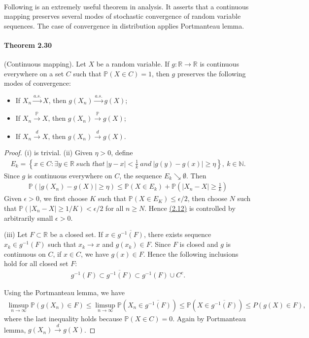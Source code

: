 \documentclass{article}
\numberwithin{equation}{section}
\renewcommand{\P}{\mathbb{P}}
\theoremstyle{plain}
\theoremstyle{definition}
\begin{document}
\paragraph{} Following is an extremely useful theorem in analysis. It asserts that a continuous mapping preserves several modes of stochastic convergence of random variable sequences. The case of convergence in distribution applies Portmanteau lemma. 

\paragraph{Theorem 2.30\label{thm:2.30}} (Continuous mapping). Let $X$ be a random variable. If $g:\mathbb{R}\to\mathbb{R}$ is continuous everywhere on a set $C$ such that $\P(X\in C)=1$, then $g$ preserves the following modes of convergence:
\begin{itemize}
	\item[(i)] If $X_n\overset{a.s.}{\to} X$, then $g(X_n)\overset{a.s.}{\to} g(X)$; 
	\item[(ii)] If $X_n\overset{\P}{\to}X$, then $g(X_n)\overset{\P}{\to}g(X)$; 
	\item[(iii)] If $X_n\overset{d}{\to}X$, then $g(X_n)\overset{d}{\to}g(X)$.
\end{itemize}

\begin{proof}
(i) is trivial. (ii) Given $\eta>0$, define
\begin{align*}
	E_k=\left\{x\in C:\exists y\in\mathbb{R}\ \textit{such that}\ \vert y-x\vert<\frac{1}{k}\ \textit{and}\ \vert g(y)-g(x)\vert\geq\eta\right\},\ k\in\mathbb{N}.
\end{align*}
Since $g$ is continuous everywhere on $C$, the sequence $E_k\searrow\emptyset$. Then
\begin{align*}
	\P\left(\vert g(X_n)-g(X)\vert\geq\eta\right) \leq \P(X\in E_k)+\P\left(\vert X_n - X\vert\geq\frac{1}{k}\right)\tag{2.12}\label{eq:2.12}
\end{align*}
Given $\epsilon>0$, we first choose $K$ such that $\P(X\in E_K)\leq\epsilon/2$, then choose $N$ such that $\P(\vert X_n-X\vert\geq 1/K)<\epsilon/2$ for all $n\geq N$. Hence \hyperref[eq:2.12]{(2.12)} is controlled by arbitrarily small $\epsilon>0$.

(iii) Let $F\subset\mathbb{R}$ be a closed set. If $x\in\overline{g^{-1}(F)}$, there exists sequence $x_k\in g^{-1}(F)$ such that $x_k\to x$ and $g(x_k)\in F$. Since $F$ is closed and $g$ is continuous on $C$, if $x\in C$, we have $g(x)\in F$. Hence the following inclusions hold for all closed set $F$:
\begin{align*}
	g^{-1}(F)\subset\overline{g^{-1}(F)}\subset g^{-1}(F)\cup C^c.
\end{align*}

Using the Portmanteau lemma, we have
\begin{align*}
	\limsup_{n\to\infty}\P(g(X_n)\in F)\leq\limsup_{n\to\infty}\P\left(X_n\in \overline{g^{-1}(F)}\right)
	\leq\P\left(X\in\overline{g^{-1}(F)}\right)\leq P(g(X)\in F),
\end{align*}
where the last inequality holds because $\P(X\in C)=0$. Again by Portmanteau lemma, $g(X_n)\overset{d}{\to}g(X)$.
\end{proof}
\end{document}
